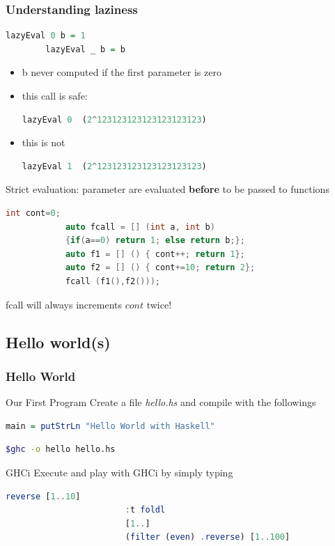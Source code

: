 \begin{frame}[fragile]\frametitle{Understanding laziness}
	\begin{lstlisting}[language=Haskell]
		lazyEval 0 b = 1
		lazyEval _ b = b
	\end{lstlisting}
	\begin{itemize}
	  \item b never computed if the first parameter is zero
	  \item this call is safe: 
	  \begin{lstlisting}[language=Haskell] 
	  	lazyEval 0	(2^123123123123123123123)
	  \end{lstlisting}
	  \item this is not 
	    \begin{lstlisting}[language=Haskell] 
	    lazyEval 1 	(2^123123123123123123123)
	  \end{lstlisting}
	\end{itemize}
	\begin{exampleblock}{Strict evaluation: parameter are evaluated
	  \textbf{before} to be passed to functions}
	\begin{itemize}
	 
	\end{itemize}
	
	 	\begin{lstlisting}[language=c++,basicstyle=\footnotesize\ttfamily]
	 	 	int cont=0;
	 	 	auto fcall = [] (int a, int b) 
	 	 	{if(a==0) return 1; else return b;};
	 	 	auto f1 = [] () { cont++; return 1};
	 	 	auto f2 = [] () { cont+=10; return 2};
	    	fcall (f1(),f2()));
	  \end{lstlisting} 
	fcall will always  increments $cont$ twice! 
	\end{exampleblock}
			
			
\end{frame}
	
\subsection{Hello world(s)}
	\begin{frame}[fragile]\frametitle{Hello World}
			\begin{block}{Our First Program}
				Create a file \emph{hello.hs} and compile with the followings
				\begin{lstlisting}[language=Haskell]
						main = putStrLn "Hello World with Haskell"
				\end{lstlisting}
				\begin{lstlisting}[language=bash]
						$ghc -o hello hello.hs
				\end{lstlisting}
			\end{block}
			\begin{block}{GHCi}
				Execute and play with GHCi by simply typing
				\begin{lstlisting}[language=Haskell]
						reverse [1..10]
						:t foldl
						[1..]
						(filter (even) .reverse) [1..100]
				\end{lstlisting}
			\end{block}
		\end{frame}
		
